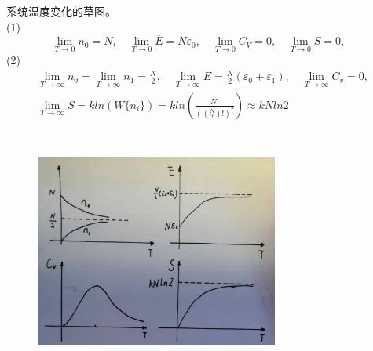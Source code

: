 \documentclass[UTF8]{ctexart}
\begin{document}
系统温度变化的草图。\\
(1)
\begin{equation*}
  \lim_{T\to0} n_0=N,\quad
  \lim_{T\to0} \overline{E}=N\varepsilon_0,\quad
  \lim_{T\to0} C_V=0,\quad
  \lim_{T\to0} S=0,\quad
\end{equation*}
(2)
\begin{equation*}
  \begin{aligned}
     & \lim_{T\to\infty}n_0=\lim_{T\to\infty}n_1=\frac{N}{2},\quad
    \lim_{T\to\infty}\overline{E}=\frac{N}{2}(\varepsilon_0+\varepsilon_1),\quad
    \lim_{T\to\infty}C_v=0,\quad                                                        \\
     & \lim_{T\to\infty}S=kln(W\{n_i\})=kln(\frac{N!}{((\frac{N}{2})!)^2})\approx kNln2
  \end{aligned}
\end{equation*}
\begin{figure}[H]
  \centering
  \includegraphics[width=8cm,height=8cm]{3_3.jpg}
\end{figure}
\end{document}
